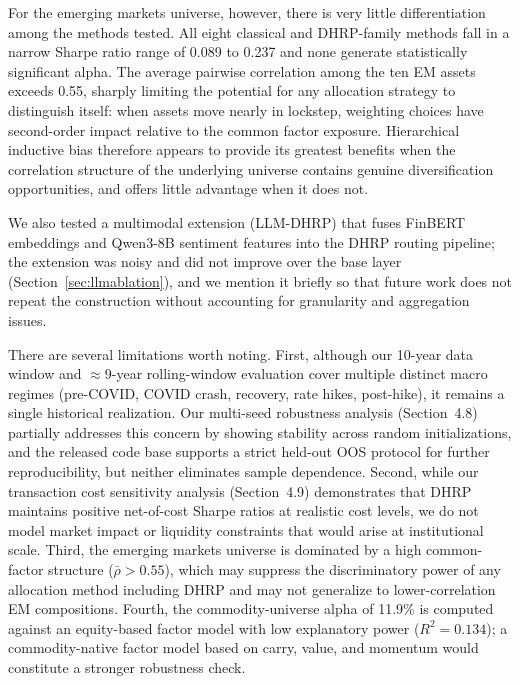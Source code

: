 \documentclass{article}
\begin{document}
For the emerging markets universe, however, there is very little differentiation among the methods tested. All eight classical and DHRP-family methods fall in a narrow Sharpe ratio range of 0.089 to 0.237 and none generate statistically significant alpha. The average pairwise correlation among the ten EM assets exceeds 0.55, sharply limiting the potential for any allocation strategy to distinguish itself: when assets move nearly in lockstep, weighting choices have second-order impact relative to the common factor exposure. Hierarchical inductive bias therefore appears to provide its greatest benefits when the correlation structure of the underlying universe contains genuine diversification opportunities, and offers little advantage when it does not.

We also tested a multimodal extension (LLM-DHRP) that fuses FinBERT \citep{Huang2023} embeddings and Qwen3-8B \citep{Qwen2025} sentiment features into the DHRP routing pipeline; the extension was noisy and did not improve over the base layer (Section~\ref{sec:llmablation}), and we mention it briefly so that future work does not repeat the construction without accounting for granularity and aggregation issues.

There are several limitations worth noting. First, although our 10-year data window and $\approx 9$-year rolling-window evaluation cover multiple distinct macro regimes (pre-COVID, COVID crash, recovery, rate hikes, post-hike), it remains a single historical realization. Our multi-seed robustness analysis (Section~4.8) partially addresses this concern by showing stability across random initializations, and the released code base supports a strict held-out OOS protocol for further reproducibility, but neither eliminates sample dependence. Second, while our transaction cost sensitivity analysis (Section~4.9) demonstrates that DHRP maintains positive net-of-cost Sharpe ratios at realistic cost levels, we do not model market impact or liquidity constraints that would arise at institutional scale. Third, the emerging markets universe is dominated by a high common-factor structure ($\bar{\rho} > 0.55$), which may suppress the discriminatory power of any allocation method including DHRP and may not generalize to lower-correlation EM compositions. Fourth, the commodity-universe alpha of 11.9\% is computed against an equity-based factor model with low explanatory power ($R^2 = 0.134$); a commodity-native factor model based on carry, value, and momentum \citep{AsnessMoskowitzPedersen2013} would constitute a stronger robustness check.
\end{document}
